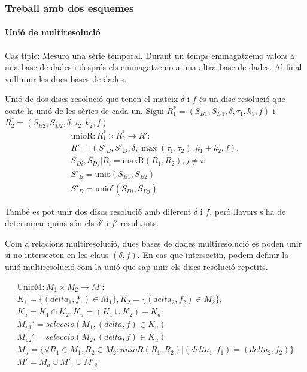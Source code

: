 \subsubsection{Treball amb dos esquemes}


\paragraph{Unió de multiresolució}

Cas típic:
Mesuro una sèrie temporal. Durant un temps emmagatzemo valors a una
base de dades i després els emmagatzemo a una altra base de dades. Al final vull unir les dues bases de dades.


Unió de dos discs resolució que tenen el mateix $\delta$ i $f$ és un
disc resolució que conté la unió de les sèries de cada un.  Sigui
$R_1^*=(S_{B1},S_{D1},\delta,\tau_1,k_1,f)$ i
$R_2^*=(S_{B2},S_{D2},\delta,\tau_2,k_2,f)$
  \begin{gather*}
    \text{unioR}: R_1^* \times R_2^* \longrightarrow R': \\
    R' = (S'_B,S'_D,\delta,\max(\tau_1,\tau_2),k_1+k_2,f), \\
    S_{Di}, S_{Dj} | R_i = \text{maxR}(R_1,R_2), j \neq i:  \\
    S'_B = \text{unio}(S_{B1},S_{B2})\\
    S'_D = \text{unio}^r(S_{Di},S_{Dj})
\end{gather*}

També es pot unir dos discs resolució amb diferent $\delta$ i $f$,
però llavors s'ha de determinar quins són els $\delta'$ i $f'$
resultants.


Com a relacions multiresolució, dues bases de dades multiresolució es
poden unir si no intersecten en les claus $(\delta,f)$.  En cas que
intersectin, podem definir la unió multiresolució com la unió que sap unir els discs resolució repetits.

\begin{gather*}
    \text{UnioM}: M_1 \times M_2 \longrightarrow M': \\
    K_1 = \{(delta_1,f_1) \in M_1\},K_2 = \{(delta_2,f_2) \in M_2\}, \\
    K_a = K_1 \cap K_2, K_u =  (K_1 \cup K_2) - K_a : \\
    M_{u1}'= seleccio(M_1, (delta,f) \in K_u)\\
    M_{u2}'= seleccio(M_2, (delta,f) \in K_u)\\
    M_a = \{\forall R_1\in M_1,R_2\in M_2: unioR(R_1,R_2) |
       (delta_1,f_1) = (delta_2,f_2) \} \\
    M' =  M_{a} \cup  M'_{1}  \cup  M'_{2}     
\end{gather*}






